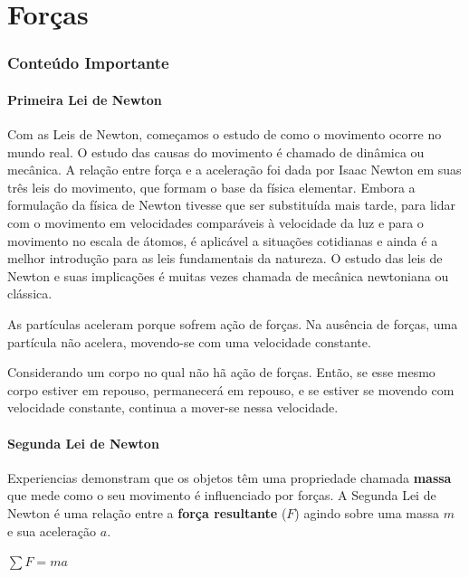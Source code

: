 \part{Forças}
\section{Conteúdo Importante}
\subsection{Primeira Lei de Newton}

Com as Leis de Newton, começamos o estudo de como o movimento ocorre no mundo real. O estudo das causas do movimento é chamado de dinâmica ou mecânica. A relação entre força e a aceleração foi dada por Isaac Newton em suas três leis do movimento, que formam o base da física elementar. Embora a formulação da física de Newton tivesse que ser substituída mais tarde, para lidar com o movimento em velocidades comparáveis à velocidade da luz e para o movimento no escala de átomos, é aplicável a situações cotidianas e ainda é a melhor introdução para as leis fundamentais da natureza. O estudo das leis de Newton e suas implicações é muitas vezes chamada de mecânica newtoniana ou clássica.

As partículas aceleram porque sofrem ação de forças. Na ausência de forças, uma partícula não acelera, movendo-se com uma velocidade constante.

\begin{definition} Considerando um corpo no qual não hã ação de forças. Então, se esse mesmo corpo estiver em repouso, permanecerá em repouso, e se estiver se movendo com velocidade constante, continua a mover-se nessa velocidade.
\end{definition}

\subsection{Segunda Lei de Newton}
Experiencias demonstram que os objetos têm uma propriedade chamada \textbf{massa} que mede como o seu movimento é influenciado por forças. A Segunda Lei de Newton é uma relação entre a \textbf{força resultante} ($F$) agindo sobre uma massa $m$ e sua aceleração $a$.

\begin{definition} $\sum F=ma$
\end{definition}

